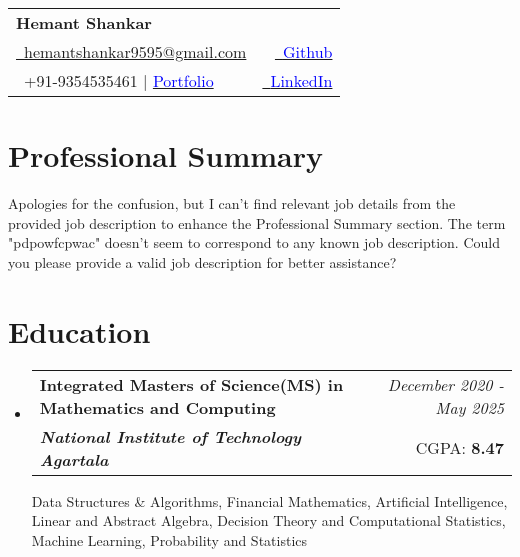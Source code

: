 \documentclass[a4paper,11pt]{article}
\makeatletter
\newcommand{\resumeSubheading}[4]{
\vspace{0.5mm}\item
    \begin{tabular*}{0.98\textwidth}[t]{l@{\extracolsep{\fill}}r}
        \textbf{#1} & \textit{\footnotesize{#4}} \\
        \textit{\footnotesize{#3}} &  \footnotesize{#2}\\
    \end{tabular*}
    \vspace{-2.4mm}
}
\newcommand{\resumeSubHeadingListStart}{\begin{itemize}[leftmargin=*,labelsep=0mm]}
\newcommand{\resumeSubHeadingListEnd}{\end{itemize}\vspace{2mm}}
\newcommand{\name}{Hemant Shankar} %
\newcommand{\phone}{9354535461 | \href{https://hemant-shankar-portfolio.onrender.com/}{\textcolor{blue}{Portfolio}}} %
\newcommand{\emaila}{hemantshankar9595@gmail.com} %
\makeatother
\begin{document}
\selectfont

{
\begin{tabularx}{\linewidth}{L r} \\
  \textbf{\Large \name}\\
  \href{mailto:hemantshankar9595@gmail.com}{\raisebox{0.0\height}{\footnotesize \faEnvelope}\ {\emaila}} & \href{https://github.com/HemantShankar}{\raisebox{0.0\height}{\footnotesize \faGithub}\ {\textcolor{blue}{Github}}} \\  
  {\raisebox{0.0\height}{\footnotesize \faPhone}\ +91-\phone} & \href{https://www.linkedin.com/in/hemant-shankar}{\raisebox{0.0\height}{\footnotesize \faLinkedin}\ {\textcolor{blue}{LinkedIn}}}
\end{tabularx}
}
\vspace{-4mm}
\section{\textbf{Professional Summary}}
Apologies for the confusion, but I can't find relevant job details from the provided job description to enhance the Professional Summary section. The term "pdpowfcpwac" doesn't seem to correspond to any known job description. Could you please provide a valid job description for better assistance?
\section{\textbf{Education}}
  \resumeSubHeadingListStart
    \resumeSubheading
      { Integrated Masters of Science(MS) in Mathematics and Computing}{CGPA: \textbf{8.47}}
      {\textbf{National Institute of Technology Agartala}}{December 2020 - May 2025}
      \vspace{0.3cm}
      \small Data Structures \& Algorithms, Financial Mathematics, Artificial Intelligence, Linear and
Abstract Algebra, Decision Theory and
Computational Statistics, Machine Learning, 
Probability and Statistics
  \resumeSubHeadingListEnd
\vspace{-8.0mm}
%

\end{document}

